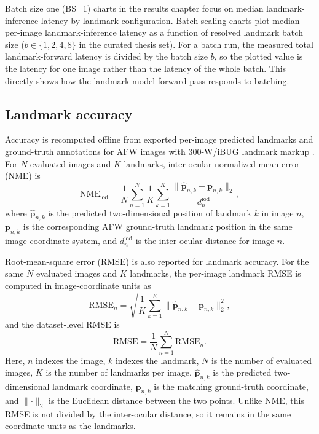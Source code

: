Batch size one (BS=1) charts in the results chapter focus on median
landmark-inference latency by landmark configuration. Batch-scaling charts plot
median per-image landmark-inference latency as a function of resolved landmark
batch size ($b \in \{1,2,4,8\}$ in the curated thesis set). For a batch run, the
measured total landmark-forward latency is divided by the batch size \(b\), so
the plotted value is the latency for one image rather than the latency of the
whole batch. This directly shows how the landmark model forward pass responds to
batching.

\subsection{Landmark accuracy}

Accuracy is recomputed offline from exported per-image predicted landmarks and
ground-truth annotations for AFW images with 300-W/iBUG landmark markup
\cite{zhu2012facedetectionwild,sagonas2013_300w}. For $N$ evaluated images and $K$ landmarks,
inter-ocular normalized mean error (NME) is
\begin{equation}
\mathrm{NME}_{\text{iod}} = \frac{1}{N}\sum_{n=1}^{N}\frac{1}{K}\sum_{k=1}^{K}
\frac{\lVert \hat{\mathbf{p}}_{n,k} - \mathbf{p}_{n,k} \rVert_2}{d^{\text{iod}}_n},
\end{equation}
where \(\hat{\mathbf{p}}_{n,k}\) is the predicted two-dimensional position of
landmark \(k\) in image \(n\), \(\mathbf{p}_{n,k}\) is the corresponding AFW
ground-truth landmark position in the same image coordinate system, and
\(d^{\text{iod}}_n\) is the inter-ocular distance for image \(n\).

Root-mean-square error (RMSE) is also reported for landmark accuracy. For the
same \(N\) evaluated images and \(K\) landmarks, the per-image landmark RMSE is
computed in image-coordinate units as
\begin{equation}
\mathrm{RMSE}_{n} =
\sqrt{\frac{1}{K}\sum_{k=1}^{K}
\lVert \hat{\mathbf{p}}_{n,k} - \mathbf{p}_{n,k} \rVert_2^2},
\end{equation}
and the dataset-level RMSE is
\begin{equation}
\mathrm{RMSE} = \frac{1}{N}\sum_{n=1}^{N}\mathrm{RMSE}_{n}.
\end{equation}
Here, \(n\) indexes the image, \(k\) indexes the landmark, \(N\) is the number of
evaluated images, \(K\) is the number of landmarks per image,
\(\hat{\mathbf{p}}_{n,k}\) is the predicted two-dimensional landmark coordinate,
\(\mathbf{p}_{n,k}\) is the matching ground-truth coordinate, and
\(\lVert\cdot\rVert_2\) is the Euclidean distance between the two points. Unlike
NME, this RMSE is not divided by the inter-ocular distance, so it remains in the
same coordinate units as the landmarks.

